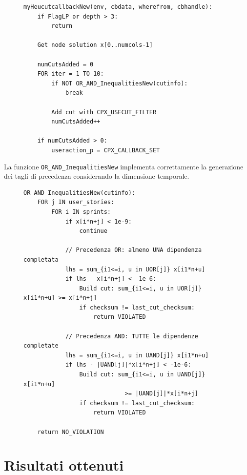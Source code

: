\documentclass[12pt,a4paper,openright,twoside]{book}
\begin{document}
\begin{figure}[H]
\begin{lstlisting}[style=pseudo, caption={Algoritmo multi-cut per la callback di generazione tagli},label={Alg.NewCallback}]
myHeucutcallbackNew(env, cbdata, wherefrom, cbhandle):
    if FlagLP or depth > 3: 
        return
    
    Get node solution x[0..numcols-1]
    
    numCutsAdded = 0
    FOR iter = 1 TO 10:
        if NOT OR_AND_InequalitiesNew(cutinfo): 
            break
        
        Add cut with CPX_USECUT_FILTER
        numCutsAdded++
    
    if numCutsAdded > 0:
        useraction_p = CPX_CALLBACK_SET
\end{lstlisting}
\end{figure}

La funzione \texttt{OR\_AND\_InequalitiesNew} implementa correttamente la generazione dei tagli di precedenza considerando la dimensione temporale.

\begin{figure}[H]
\begin{lstlisting}[style=pseudo, caption={Generazione corretta dei tagli di precedenza OR-AND},label={Alg.NewCuts}]
OR_AND_InequalitiesNew(cutinfo):
    FOR j IN user_stories:
        FOR i IN sprints:
            if x[i*n+j] < 1e-9: 
                continue
            
            // Precedenza OR: almeno UNA dipendenza completata
            lhs = sum_{i1<=i, u in UOR[j]} x[i1*n+u]
            if lhs - x[i*n+j] < -1e-6:
                Build cut: sum_{i1<=i, u in UOR[j]} x[i1*n+u] >= x[i*n+j]
                if checksum != last_cut_checksum:
                    return VIOLATED
            
            // Precedenza AND: TUTTE le dipendenze completate
            lhs = sum_{i1<=i, u in UAND[j]} x[i1*n+u]
            if lhs - |UAND[j]|*x[i*n+j] < -1e-6:
                Build cut: sum_{i1<=i, u in UAND[j]} x[i1*n+u] 
                             >= |UAND[j]|*x[i*n+j]
                if checksum != last_cut_checksum:
                    return VIOLATED
    
    return NO_VIOLATION
\end{lstlisting}
\end{figure}



\chapter{Risultati ottenuti}
\end{document}
